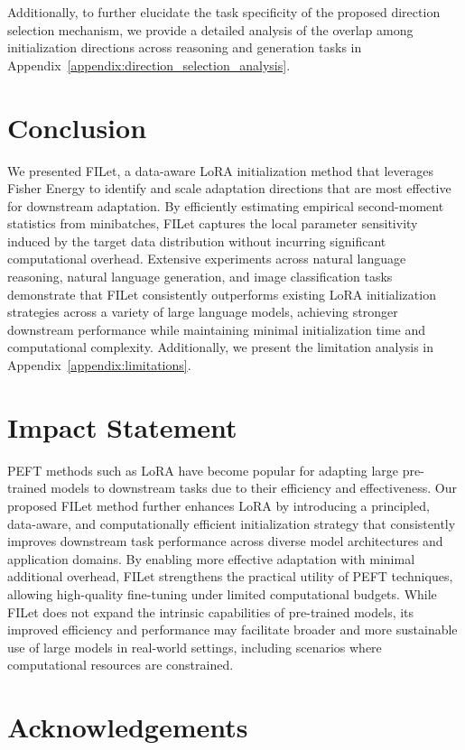 \documentclass{article}
\theoremstyle{plain}
\theoremstyle{definition}
\theoremstyle{remark}
\begin{document}
Additionally, to further elucidate the task specificity of the proposed direction selection mechanism, we provide a detailed analysis of the overlap among initialization directions across reasoning and generation tasks in Appendix~\ref{appendix:direction_selection_analysis}. 

\section{Conclusion}

We presented FILet, a data-aware LoRA initialization method that leverages Fisher Energy to identify and scale adaptation directions that are most effective for downstream adaptation. By efficiently estimating empirical second-moment statistics from minibatches, FILet captures the local parameter sensitivity induced by the target data distribution without incurring significant computational overhead. Extensive experiments across natural language reasoning, natural language generation, and image classification tasks demonstrate that FILet consistently outperforms existing LoRA initialization strategies across a variety of large language models, achieving stronger downstream performance while maintaining minimal initialization time and computational complexity.
Additionally, we present the limitation analysis in Appendix~\ref{appendix:limitations}.

\section*{Impact Statement}

PEFT methods such as LoRA have become popular for adapting large pre-trained models to downstream tasks due to their efficiency and effectiveness. Our proposed FILet method further enhances LoRA by introducing a principled, data-aware, and computationally efficient initialization strategy that consistently improves downstream task performance across diverse model architectures and application domains. By enabling more effective adaptation with minimal additional overhead, FILet strengthens the practical utility of PEFT techniques, allowing high-quality fine-tuning under limited computational budgets. While FILet does not expand the intrinsic capabilities of pre-trained models, its improved efficiency and performance may facilitate broader and more sustainable use of large models in real-world settings, including scenarios where computational resources are constrained. 

\section*{Acknowledgements}
\end{document}
